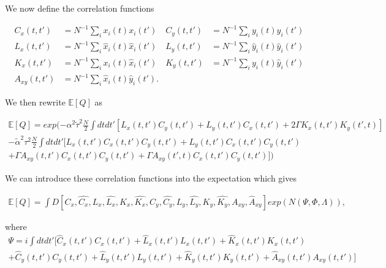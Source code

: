 \documentclass[.../main.tex]{subfiles}
\begin{document}
	We now define the correlation functions

		\begin{align*}
C_x(t, t') &= N^{-1} \sum_i x_i(t) x_i(t') & C_y(t, t') &= N^{-1} \sum_i y_i(t) y_i(t')\\
L_x(t, t') &= N^{-1} \sum_i \hat{x}_i(t) \hat{x}_i(t') & L_y(t, t') &= N^{-1} \sum_i \hat{y}_i(t) \hat{y}_i(t') \\
K_x(t, t') &= N^{-1} \sum_i x_i(t) \hat{x}_i(t') & K_y(t, t') &= N^{-1} \sum_i y_i(t) \hat{y}_i(t')\\
A_{xy}(t, t') &= N^{-1} \sum_i \hat{x}_i(t) \hat{y}_i(t').
\end{align*}

We then rewrite $\mathbb{E}[Q]$ as 

\begin{equation}
\begin{split}
		\mathbb{E}[Q] = exp(- \alpha^2 \tilde{\tau}^2 \frac{N}{2} \int dt dt'[L_x(t, t')C_y(t, t')
		+ L_y(t, t')C_x(t, t') + 2 \Gamma K_x(t, t') K_y(t', t)] \\
	- \tilde{\alpha}^2 \tau^2 \frac{N}{2} \int dtdt' [L_x(t, t') C_x(t, t') C_y(t, t') + L_y(t, t')
	C_x(t, t') C_y(t, t') \\ + \Gamma A_{xy}(t, t') C_x(t, t') C_y(t, t') + \Gamma A_{xy}(t', t) C_x
	(t, t') C_y(t, t')] )
\end{split}
\end{equation}

We can introduce these correlation functions into the expectation which gives

\begin{equation}
	\begin{split}
		\mathbb{E}[Q] = \int D[C_x, \hat{C_x}, L_x, \hat{L_x}, K_x, 
		\hat{K_x}, C_y, \hat{C_y}, L_y, \hat{L_y}, K_y, 
		\hat{K_y}, A_{xy}, \hat{A}_{xy}] 
		exp(N(\Psi, \Phi, \Lambda)),
	\end{split}
\end{equation}

where
\begin{equation}
	\begin{split}
	\Psi = i \int dtdt' [\hat{C}_x(t, t') C_x(t, t') + \hat{L}_x(t, t') L_x(t, t') + \hat{K}_x
		(t, t') K_x(t, t') \\ + \hat{C}_y(t, t') C_y(t, t') + \hat{L}_y(t, t') L_y(t, t') + 
		\hat{K}_y(t, t') K_y(t, t') + \hat{A}_{xy}(t, t') A_{xy}(t, t')]
	\end{split}
\end{equation}
\end{document}
